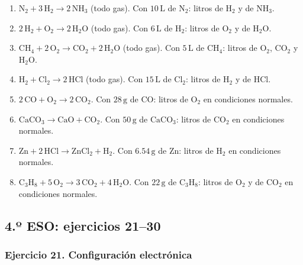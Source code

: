 \begin{enumerate}
    \item[a)] $\mathrm{N_2}+3\,\mathrm{H_2}\rightarrow2\,\mathrm{NH_3}$
    (todo gas).
    Con $10\,\mathrm{L}$ de $\mathrm{N_2}$:
    litros de $\mathrm{H_2}$ y de $\mathrm{NH_3}$.

    \item[b)] $2\,\mathrm{H_2}+\mathrm{O_2}\rightarrow2\,\mathrm{H_2O}$
    (todo gas).
    Con $6\,\mathrm{L}$ de $\mathrm{H_2}$:
    litros de $\mathrm{O_2}$ y de $\mathrm{H_2O}$.

    \item[c)] $\mathrm{CH_4}+2\,\mathrm{O_2}\rightarrow
    \mathrm{CO_2}+2\,\mathrm{H_2O}$ (todo gas).
    Con $5\,\mathrm{L}$ de $\mathrm{CH_4}$:
    litros de $\mathrm{O_2}$, $\mathrm{CO_2}$ y $\mathrm{H_2O}$.

    \item[d)] $\mathrm{H_2}+\mathrm{Cl_2}\rightarrow2\,\mathrm{HCl}$
    (todo gas).
    Con $15\,\mathrm{L}$ de $\mathrm{Cl_2}$:
    litros de $\mathrm{H_2}$ y de $\mathrm{HCl}$.

    \item[e)] $2\,\mathrm{CO}+\mathrm{O_2}\rightarrow2\,\mathrm{CO_2}$.
    Con $28\,\mathrm{g}$ de $\mathrm{CO}$:
    litros de $\mathrm{O_2}$ en condiciones normales.

    \item[f)] $\mathrm{CaCO_3}\rightarrow\mathrm{CaO}+\mathrm{CO_2}$.
    Con $50\,\mathrm{g}$ de $\mathrm{CaCO_3}$:
    litros de $\mathrm{CO_2}$ en condiciones normales.

    \item[g)] $\mathrm{Zn}+2\,\mathrm{HCl}\rightarrow
    \mathrm{ZnCl_2}+\mathrm{H_2}$.
    Con $6.54\,\mathrm{g}$ de Zn:
    litros de $\mathrm{H_2}$ en condiciones normales.

    \item[h)] $\mathrm{C_3H_8}+5\,\mathrm{O_2}\rightarrow
    3\,\mathrm{CO_2}+4\,\mathrm{H_2O}$.
    Con $22\,\mathrm{g}$ de $\mathrm{C_3H_8}$:
    litros de $\mathrm{O_2}$ y de $\mathrm{CO_2}$ en condiciones normales.
\end{enumerate}

\subsection{4.º ESO: ejercicios 21--30}

\subsubsection*{Ejercicio 21. Configuración electrónica}

